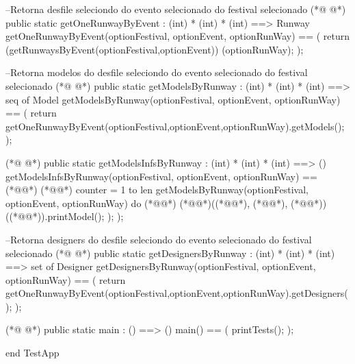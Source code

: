 \begin{vdmpp}[breaklines=true]
 --Retorna desfile seleciondo do evento selecionado do festival selecionado
(*@
\label{getOneRunwayByEvent:123}
@*)
  public static getOneRunwayByEvent : (int) * (int) * (int) ==> Runway
 getOneRunwayByEvent(optionFestival, optionEvent, optionRunWay) ==
 (
  return (getRunwaysByEvent(optionFestival,optionEvent)) (optionRunWay);
 );
 
 --Retorna modelos do desfile seleciondo do evento selecionado do festival selecionado
(*@
\label{getModelsByRunway:130}
@*)
 public static getModelsByRunway : (int) * (int) * (int) ==> seq of Model
 getModelsByRunway(optionFestival, optionEvent, optionRunWay) ==
 (
 return getOneRunwayByEvent(optionFestival,optionEvent,optionRunWay).getModels();
 );
    
(*@
\label{getModelsInfsByRunway:136}
@*)
  public static getModelsInfsByRunway : (int) * (int) * (int) ==> ()
 getModelsInfsByRunway(optionFestival, optionEvent, optionRunWay) ==
 (*@\vdmnotcovered{(}@*)
   (*@@*) counter = 1 to len getModelsByRunway(optionFestival, optionEvent, optionRunWay) do (*@\vdmnotcovered{(}@*)
    (*@@*)((*@@*), (*@@*), (*@@*)) ((*@@*)).printModel();
   );
 );
 
  --Retorna designers do desfile seleciondo do evento selecionado do festival selecionado  
(*@
\label{getDesignersByRunway:145}
@*)
  public static getDesignersByRunway : (int) * (int) * (int) ==> set of Designer
 getDesignersByRunway(optionFestival, optionEvent, optionRunWay) ==
 (
 return getOneRunwayByEvent(optionFestival,optionEvent,optionRunWay).getDesigners();
 );
 
  
  

(*@
\label{main:154}
@*)
public static main : () ==> ()
  main() ==
  (
   printTests();
  );

end TestApp
\end{vdmpp}
\bigskip
